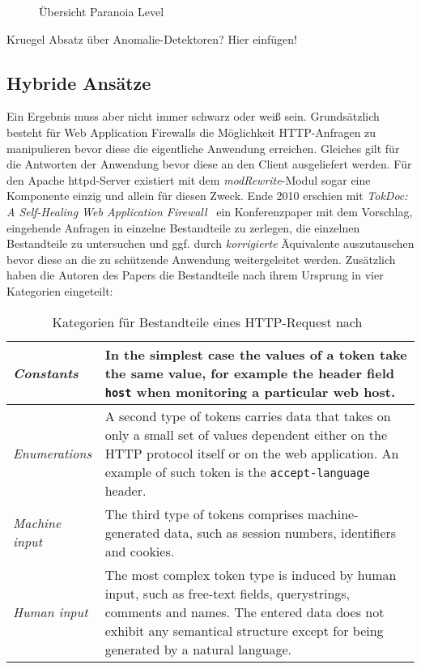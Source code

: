 \begin{figure}[h]
  \centering
  
  \caption{Übersicht Paranoia Level~\cite{owaspcrs}}
  \label{fig.paranoia}
\end{figure}



\begin{neu}
  Kruegel Absatz über Anomalie-Detektoren? Hier einfügen!
\end{neu}

\subsection{Hybride Ansätze} %
Ein Ergebnis muss aber nicht immer schwarz oder weiß sein.  Grundsätzlich besteht für Web Application Firewalls die Möglichkeit HTTP-Anfragen zu manipulieren bevor diese die eigentliche Anwendung erreichen. Gleiches gilt für die Antworten der Anwendung bevor diese an den Client ausgeliefert werden. Für den Apache httpd-Server existiert mit dem \emph{modRewrite}-Modul sogar eine Komponente einzig und allein für diesen Zweck. Ende 2010 erschien mit \glqq\emph{TokDoc: A Self-Healing Web Application Firewall}\grqq~\cite{Krueger2010} ein Konferenzpaper mit dem Vorschlag, eingehende Anfragen in einzelne Bestandteile zu zerlegen, die einzelnen Bestandteile zu untersuchen und ggf. durch \emph{korrigierte} Äquivalente auszutauschen bevor diese an die zu schützende Anwendung weitergeleitet werden. Zusätzlich haben die Autoren des Papers die Bestandteile nach ihrem Ursprung in vier Kategorien eingeteilt:\\

\begin{table}[h]
  \centering
  \begin{tabular}{|l|p{8cm}|}
    \hline
    \emph{Constants} & In the simplest case the values of a token take the same value, for example the header field \verb=host= when monitoring a particular web host. \\
    \hline
    \emph{Enumerations} &  A second type of tokens carries data that takes on only a small set of values dependent either on the HTTP protocol itself or on the web application. An example of such token is the \verb=accept-language= header.\\
    \hline
    \emph{Machine input} & The third type of tokens comprises machine-generated data, such as session numbers, identifiers and cookies. \\
    \hline
    \emph{Human input} & The most complex token type is induced by human input, such as free-text fields, querystrings, comments and names. The entered data does not exhibit any semantical structure except for being generated by a natural language.  \\
    \hline
  \end{tabular}
  \caption{Kategorien für Bestandteile eines HTTP-Request nach~\cite{Krueger2010}}
  \label{tab:tocdoc}
\end{table}

